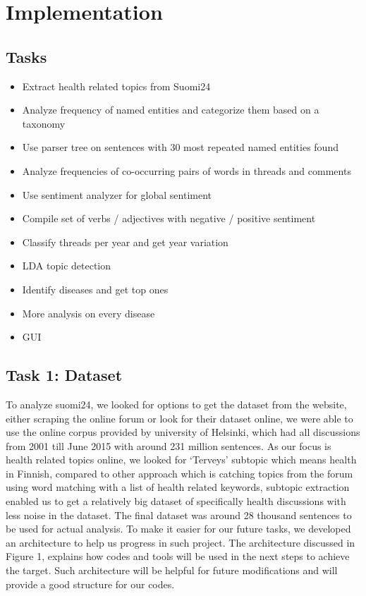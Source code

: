 \documentclass[conference]{IEEEtran}
\begin{document}
\section{Implementation}

\subsection{Tasks}
\begin{itemize}
    \item Extract health related topics from Suomi24
    \item Analyze frequency of named entities and categorize them based on a taxonomy
    \item Use parser tree on sentences with 30 most repeated named entities found
    \item Analyze frequencies of co-occurring pairs of words in threads and comments
    \item Use sentiment analyzer for global sentiment
    \item Compile set of verbs / adjectives with negative / positive sentiment
    \item Classify threads per year and get year variation
    \item LDA topic detection
    \item Identify diseases and get top ones
    \item More analysis on every disease
    \item GUI
\end{itemize}

\subsection{Task 1: Dataset}
To analyze suomi24, we looked for options to get the dataset from the website, either scraping the online forum or look for their dataset online, we were able to use the online corpus provided by university of Helsinki, which had all discussions from 2001 till June 2015 with around 231 million sentences. As our focus is health related topics online, we looked for ‘Terveys’ subtopic which means health in Finnish, compared to other approach which is catching topics from the forum using word matching with a list of health related keywords, subtopic extraction enabled us to get a relatively big dataset of specifically health discussions with less noise in the dataset. The final dataset was around 28 thousand sentences to be used for actual analysis. To make it easier for our future tasks, we developed an architecture to help us progress in such project. The architecture discussed in Figure 1, explains how codes and tools will be used in the next steps to achieve the target. Such architecture will be helpful for future modifications and will provide a good structure for our codes.
\end{document}
